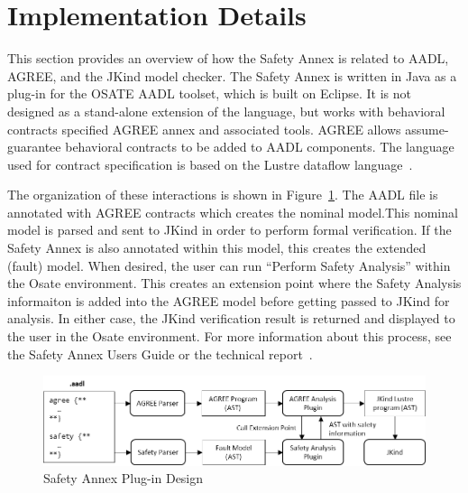 \section{Implementation Details}


This section provides an overview of how the Safety Annex is related to AADL, AGREE, and the JKind model checker.  The Safety Annex is written in Java as a plug-in for the OSATE AADL toolset, which is built on Eclipse.  It is not designed as a stand-alone extension of the language, but works with behavioral contracts specified AGREE annex and associated tools.  AGREE allows assume-guarantee behavioral contracts to be added to AADL components.  The language used for contract specification is based on the Lustre dataflow language~\cite{Halbwachs91:IEEE}. 

The organization of these interactions  is shown in Figure~\ref{fig:plugin-arch}. The AADL file is annotated with AGREE contracts which creates the nominal model.This nominal model is parsed and sent to JKind in order to perform formal verification. If the Safety Annex is also annotated within this model, this creates the extended (fault) model. When desired, the user can run ``Perform Safety Analysis'' within the Osate environment. This creates an extension point where the Safety Analysis informaiton is added into the AGREE model before getting passed to JKind for analysis. In either case, the JKind verification result is returned and displayed to the user in the Osate environment. For more information about this process, see the Safety Annex Users Guide or the technical report~\cite{amaseRepo,SATechReport}.

\begin{figure}
\begin{center}
\includegraphics[width=.9\textwidth]{images/arch.png}
\end{center}
\vspace{-0.2in}
\caption{Safety Annex Plug-in Design}
\label{fig:plugin-arch}
\end{figure}

